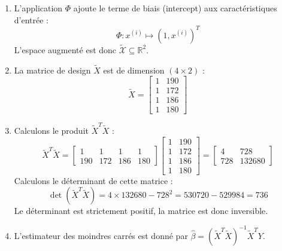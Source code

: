 \documentclass[solutions]{../exercices}
\begin{document}
\begin{solution}
    \begin{enumerate}
        \item L'application $\Phi$ ajoute le terme de biais (intercept) aux caractéristiques d'entrée :
        \[
            \Phi: x^{(i)} \mapsto \left(1, x^{(i)}\right)^T
        \]
        L'espace augmenté est donc $\tilde{\mathcal{X}} \subseteq \mathbb{R}^2$.

        \item La matrice de design $\tilde{X}$ est de dimension $(4 \times 2)$ :
        \[
            \tilde{X} = \begin{bmatrix}
                1 & 190 \\
                1 & 172 \\
                1 & 186 \\
                1 & 180
            \end{bmatrix}
        \]

        \item Calculons le produit $\tilde{X}^T \tilde{X}$ :
        \[
            \tilde{X}^T \tilde{X} = \begin{bmatrix}
                1 & 1 & 1 & 1 \\
                190 & 172 & 186 & 180
            \end{bmatrix}
            \begin{bmatrix}
                1 & 190 \\
                1 & 172 \\
                1 & 186 \\
                1 & 180
            \end{bmatrix}
            = \begin{bmatrix}
                4 & 728 \\
                728 & 132680
            \end{bmatrix}
        \]
        Calculons le déterminant de cette matrice :
        \[
            \det(\tilde{X}^T \tilde{X}) = 4 \times 132680 - 728^2 = 530720 - 529984 = 736
        \]
        Le déterminant est strictement positif, la matrice est donc inversible.

        \item L'estimateur des moindres carrés est donné par $\hat{\beta} = (\tilde{X}^T \tilde{X})^{-1} \tilde{X}^T Y$.


\end{enumerate}
\end{solution}
\end{document}

